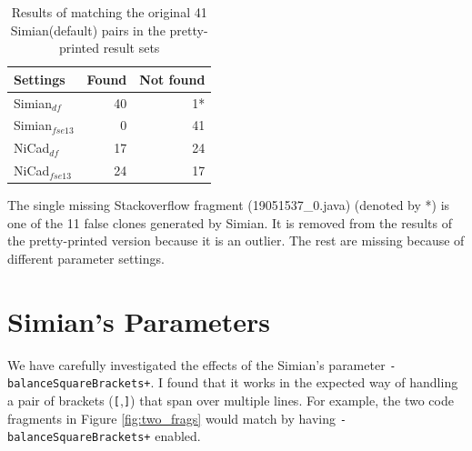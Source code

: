 \documentclass{IEEEtran}
\begin{document}
\begin{table}[H]
	\centering
	\caption{Results of matching the original 41 Simian(default) pairs in the pretty-printed result sets}
	\label{tab:search}
	\begin{tabular}{l|r|r}
		\hline 
		Settings & Found & Not found \\ 
		\hline 
		Simian$_{df}$  &  40 & 1* \\ 
		\hline 
		Simian$_{fse13}$ & 0 & 41  \\ 
		\hline 
		NiCad$_{df}$  & 17 & 24 \\ 
		\hline 
		NiCad$_{fse13}$ &  24 & 17 \\ 
		\hline 
	\end{tabular} 
\end{table}

The single missing Stackoverflow fragment (19051537\_0.java) (denoted by *) is one of the 11 false clones generated by Simian. It is removed from the results of the pretty-printed version because it is an outlier. The rest are missing because of different parameter settings.

\section*{Simian's Parameters}

We have carefully investigated the effects of the Simian's parameter \texttt{-balanceSquareBrackets+}. I found that it works in the expected way of handling a pair of brackets (\texttt{[},\texttt{]}) that span over multiple lines. For example, the two code fragments in Figure \ref{fig:two_frags} would match by having \texttt{-balanceSquareBrackets+} enabled.
\end{document}
